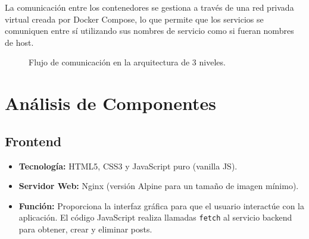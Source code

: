\documentclass[12pt, a4paper]{article}
\begin{document}
La comunicación entre los contenedores se gestiona a través de una red privada virtual creada por Docker Compose, lo que permite que los servicios se comuniquen entre sí utilizando sus nombres de servicio como si fueran nombres de host.

\begin{figure}[h]
    \centering
    \caption{Flujo de comunicación en la arquitectura de 3 niveles.}
\end{figure}

\section{Análisis de Componentes}

\subsection{Frontend}
\begin{itemize}
    \item \textbf{Tecnología:} HTML5, CSS3 y JavaScript puro (vanilla JS).
    \item \textbf{Servidor Web:} Nginx (versión Alpine para un tamaño de imagen mínimo).
    \item \textbf{Función:} Proporciona la interfaz gráfica para que el usuario interactúe con la aplicación. El código JavaScript realiza llamadas \texttt{fetch} al servicio backend para obtener, crear y eliminar posts.
\end{itemize}
\end{document}
